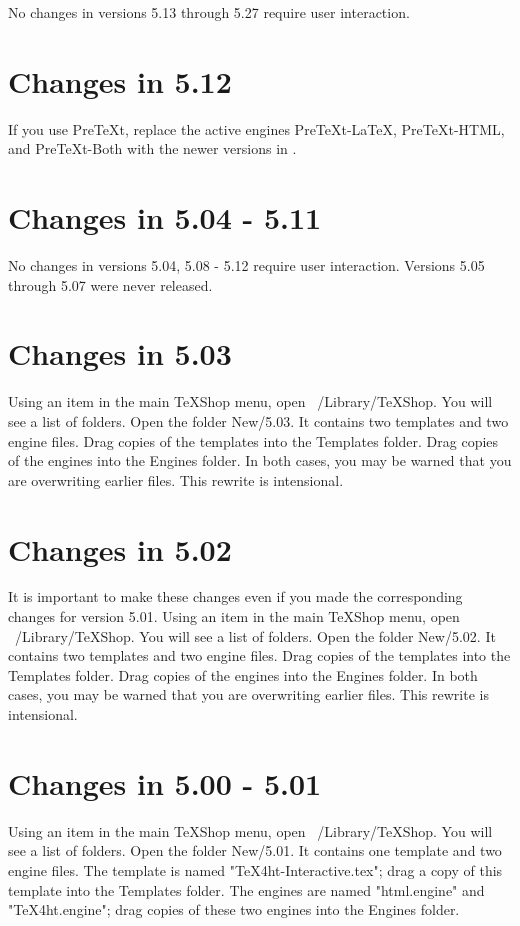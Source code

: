 \documentclass[11pt, oneside]{amsart}
\begin{document}
No changes in versions 5.13 through 5.27 require user interaction.


\section{Changes in 5.12}

If you use PreTeXt, replace the active engines PreTeXt-LaTeX, PreTeXt-HTML, and PreTeXt-Both with the newer versions in .  

\section{Changes in 5.04 - 5.11}

No changes in versions 5.04, 5.08 - 5.12 require user interaction. Versions 5.05 through 5.07 were never released.

\section{Changes in 5.03}
Using an item in the main TeXShop menu, open ~/Library/TeXShop. You will see a list of folders. Open the folder New/5.03. It contains two templates and two engine files. Drag copies of the templates into the Templates folder. Drag copies of the engines into the Engines folder.  In both cases, you may be warned that you are overwriting earlier files. This rewrite is intensional. 


\section{Changes in 5.02}

It is important to make these changes even if you made the corresponding changes for version 5.01. Using an item in the main TeXShop menu, open ~/Library/TeXShop. You will see a list of folders. Open the folder New/5.02. It contains two templates and two engine files. Drag copies of the templates into the Templates folder. Drag copies of the engines into the Engines folder.  In both cases, you may be warned that you are overwriting earlier files. This rewrite is intensional. 

\section{Changes in 5.00 - 5.01}

Using an item in the main TeXShop menu, open ~/Library/TeXShop. You will see a list of folders. Open the folder New/5.01. It contains one template and two engine files. The template is named "TeX4ht-Interactive.tex"; drag a copy of this template into the Templates folder. The engines are named "html.engine" and "TeX4ht.engine"; drag copies of these two engines into the Engines folder. 
\end{document}
